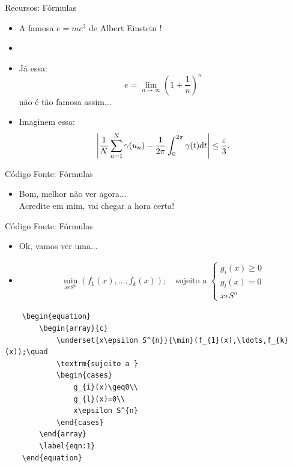 \begin{frame}{Recursos: Fórmulas}
    \begin{itemize}
            \item A famosa $e=mc^2$ de Albert Einstein !
            \item []
            \item Já essa: \[ e=\lim_{n \to \infty} \left(1+\frac{1}{n}\right)^n \] não é tão famosa assim...
            \item Imaginem essa:
            $$\left|{1\over N}\sum_{n=1}^N \gamma(u_n)-{1\over 2\pi}\int_0^{2\pi}\gamma(t){\rm d}t\right| \le {\varepsilon\over 3}.$$
    \end{itemize}
\end{frame}
\begin{frame}{Código Fonte: Fórmulas}
    \begin{itemize}
        \item Bom, melhor não ver agora...\\Acredite em mim, vai chegar a hora certa!
    \end{itemize}
\end{frame}
\begin{frame}[fragile]{Código Fonte: Fórmulas}
    \begin{itemize}
        \item Ok, vamos ver uma...
        \item []
        \begin{equation}
            \begin{array}{c}
                \underset{x\epsilon S^{n}}{\min}(f_{1}(x),\ldots,f_{k}(x));\quad
                \textrm{sujeito a }
                    \begin{cases}
                        g_{i}(x)\geq0\\
                        g_{l}(x)=0\\
                        x\epsilon S^{n}
                    \end{cases}
            \end{array}
            \label{eqn:1}
        \end{equation}
    \end{itemize}
    \begin{lstlisting}
    \begin{equation}
        \begin{array}{c}
            \underset{x\epsilon S^{n}}{\min}(f_{1}(x),\ldots,f_{k}(x));\quad
            \textrm{sujeito a }
            \begin{cases}
                g_{i}(x)\geq0\\
                g_{l}(x)=0\\
                x\epsilon S^{n}
            \end{cases}
        \end{array}
        \label{eqn:1}
    \end{equation}
    \end{lstlisting}
\end{frame}

